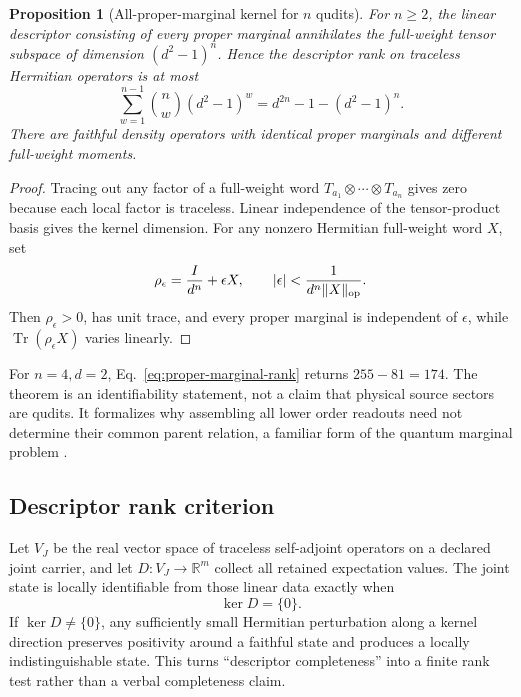 \documentclass[11pt]{article}
\newtheorem{proposition}{Proposition}
\newcommand{\Tr}{\operatorname{Tr}}
\begin{document}
\begin{proposition}[All-proper-marginal kernel for \(n\) qudits]
For \(n\ge2\), the linear descriptor consisting of every proper marginal
annihilates the full-weight tensor subspace of dimension
\((d^2-1)^n\).  Hence the descriptor rank on traceless Hermitian operators is
at most
\begin{equation}
 \sum_{w=1}^{n-1}\binom{n}{w}(d^2-1)^w
 =d^{2n}-1-(d^2-1)^n.
 \label{eq:proper-marginal-rank}
\end{equation}
There are faithful density operators with identical proper marginals and
different full-weight moments.
\end{proposition}
\begin{proof}
Tracing out any factor of a full-weight word
\(T_{a_1}\otimes\cdots\otimes T_{a_n}\) gives zero because each local factor
is traceless.  Linear independence of the tensor-product basis gives the
kernel dimension.  For any nonzero Hermitian full-weight word \(X\), set
\begin{equation}
 \rho_\epsilon=\frac{I}{d^n}+\epsilon X,
 \qquad
 |\epsilon|<\frac{1}{d^n\lVert X\rVert_{\rm op}}.
 \label{eq:general-marginal-family}
\end{equation}
Then \(\rho_\epsilon>0\), has unit trace, and every proper marginal is
independent of \(\epsilon\), while \(\Tr(\rho_\epsilon X)\) varies linearly.
\end{proof}

For \(n=4,d=2\), Eq.~\eqref{eq:proper-marginal-rank} returns
\(255-81=174\).  The theorem is an identifiability statement, not a claim that
physical source sectors are qudits.  It formalizes why assembling all lower
order readouts need not determine their common parent relation, a familiar
form of the quantum marginal problem \cite{Klyachko2006,Bravyi2004,
LindenPopescuWootters2002}.

\subsection{Descriptor rank criterion}

Let \(V_J\) be the real vector space of traceless self-adjoint operators on a
declared joint carrier, and let
\(D:V_J\to\mathbb R^m\) collect all retained expectation values.  The joint
state is locally identifiable from those linear data exactly when
\begin{equation}
 \ker D=\{0\}.
 \label{eq:descriptor-rank}
\end{equation}
If \(\ker D\ne\{0\}\), any sufficiently small Hermitian perturbation along a
kernel direction preserves positivity around a faithful state and produces a
locally indistinguishable state.  This turns ``descriptor completeness'' into
a finite rank test rather than a verbal completeness claim.
\end{document}
